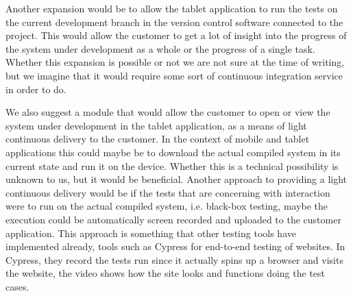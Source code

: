 Another expansion would be to allow the tablet application to run the tests on the current development branch in the version control software connected to the project.
This would allow the customer to get a lot of insight into the progress of the system under development as a whole or the progress of a single task.
Whether this expansion is possible or not we are not sure at the time of writing, but we imagine that it would require some sort of continuous integration service in order to do.

We also suggest a module that would allow the customer to open or view the system under development in the tablet application, as a means of light continuous delivery to the customer.
In the context of mobile and tablet applications this could maybe be to download the actual compiled system in its current state and run it on the device. 
Whether this is a technical possibility is unknown to us, but it would be beneficial.
Another approach to providing a light continuous delivery would be if the tests that are concerning with interaction were to run on the actual compiled system, i.e. black-box testing, maybe the execution could be automatically screen recorded and uploaded to the customer application.
This approach is something that other testing tools have implemented already, tools such as Cypress for end-to-end testing of websites.
In Cypress, they record the tests run since it actually spins up a browser and visits the website, the video shows how the site looks and functions doing the test cases.
